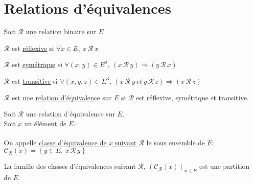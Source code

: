 \documentclass[12pt,twoside,a4paper]{article}
\begin{document}
	\section{Relations d'\'equivalences}
		Soit $\mathcal{R}$ une relation binaire sur $E$
		\begin{defi}$\mathcal{R}$ est \underline{r\'eflexive} si $\forall x\in E,\ x\,\mathcal{R}\, x$\end{defi}
		\begin{defi}$\mathcal{R}$ est \underline{sym\'etrique} si $\forall(x,y)\in E^2,\ (x\,\mathcal{R}\,y)\Rightarrow(y\,\mathcal{R}\,x)$\end{defi}
		\begin{defi}$\mathcal{R}$ est \underline{transitive} si $\forall(x,y,z)\in E^3,\ (x\,\mathcal{R}\,y\ et\ y\,\mathcal{R}\,z)\Rightarrow(x\,\mathcal{R}\,z)$\end{defi}
		\begin{defi}$\mathcal{R}$ est une \underline{relation d'\'equivalence} sur $E$ si $\mathcal{R}$ est r\'eflexive, sym\'etrique et transitive.\end{defi}
		\begin{defi}
			Soit $\mathcal{R}$ une relation d'\'equivalence sur $E$.\\
			Soit $x$ un \'el\'ement de $E$.\\
			\\
			On appelle \underline{classe d'\'equivalence de $x$ suivant $\mathcal{R}$} le sous ensemble de $E$:\\
			$\mathcal{C_R}(x)=\left\{y\in E,\ x\,\mathcal{R}\,y\right\}$
		\end{defi}
		\begin{prop}
			La famille des classes d'\'equivalences suivant $\mathcal{R}$, $\left(\mathcal{C_R}(x)\right)_{x\in E}$ est une partition de $E$.
		\end{prop}
\end{document}
